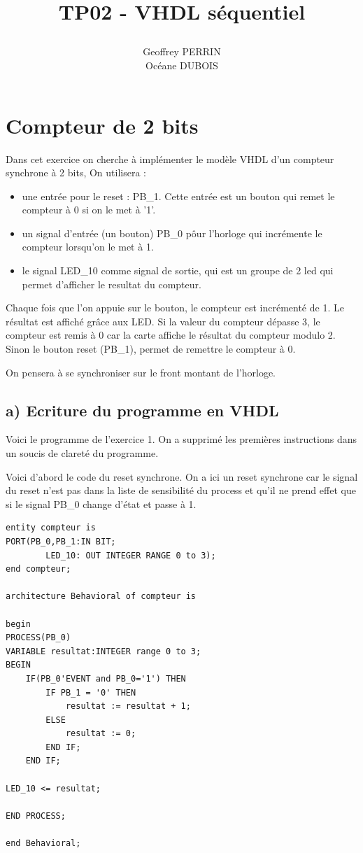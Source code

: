 \documentclass[11pt]{report}
\title{\textbf{TP02 - VHDL séquentiel}
\author{Geoffrey PERRIN \\ Océane DUBOIS\\}
\date{}}
\begin{document}
\maketitle

\newpage


\section{Compteur de 2 bits}

Dans cet exercice on cherche à implémenter le  modèle VHDL d'un compteur synchrone à 2 bits, 
On utilisera : \begin{itemize}
	 \item  une entrée  pour le reset : PB\_1. Cette entrée est un bouton qui remet le compteur à 0 si on le met à '1'.
	\item un signal d'entrée (un bouton) PB\_0 pôur l'horloge qui incrémente le compteur lorsqu'on le met à 1.
	 \item le signal LED\_10 comme signal de sortie, qui est un groupe de 2 led qui permet d'afficher le resultat du compteur.
	 
	\end{itemize}

\medskip

Chaque fois que l'on appuie sur le bouton, le compteur est incrémenté de 1. Le résultat est affiché grâce aux LED. Si la valeur du compteur dépasse 3, le compteur est remis à 0 car la carte affiche le résultat du compteur modulo 2. Sinon le bouton reset (PB\_1), permet de remettre le compteur à 0.

\medskip

On pensera à se synchroniser sur le front montant de l'horloge.

\subsection{ a) Ecriture du programme en VHDL}

Voici le programme de l'exercice 1. On a supprimé les premières instructions dans un soucis de clareté du programme.

Voici d'abord le code du reset synchrone. On a ici un reset synchrone car le signal du reset n'est pas dans la liste de sensibilité du process et qu'il ne prend effet que si le signal PB\_0 change d'état et passe à 1.

\begin{lstlisting}
entity compteur is
PORT(PB_0,PB_1:IN BIT;
		LED_10: OUT INTEGER RANGE 0 to 3);
end compteur;

architecture Behavioral of compteur is

begin
PROCESS(PB_0)
VARIABLE resultat:INTEGER range 0 to 3;
BEGIN
	IF(PB_0'EVENT and PB_0='1') THEN
		IF PB_1 = '0' THEN 
			resultat := resultat + 1;
		ELSE
			resultat := 0;
		END IF;
	END IF;

LED_10 <= resultat;

END PROCESS;

end Behavioral;

\end{lstlisting}
\end{document}

